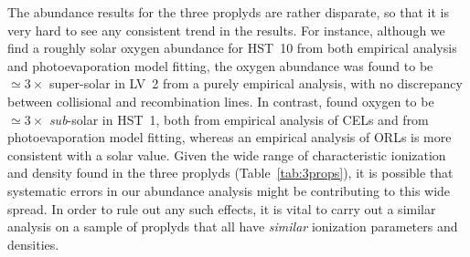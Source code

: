 \documentclass[useAMS,usenatbib]{mn2e}
\begin{document}
The abundance results for the three proplyds are rather disparate, so that it is very hard to see any consistent trend in the results.   For instance, although we find a roughly solar oxygen abundance for HST~10 from both empirical analysis and photoevaporation model fitting, the oxygen abundance was found to be \(\simeq 3 \times\) super-solar in LV~2 \citep{Tsamis:2011} from a purely empirical analysis, with no discrepancy between collisional and recombination lines.  In contrast, \citet{Mesa-Delgado:2012} found oxygen to be \(\simeq 3 \times\) \emph{sub}-solar in HST~1, both from empirical analysis of CELs and from photoevaporation model fitting, whereas an empirical analysis of ORLs is more consistent with a solar value.   Given the wide range of characteristic ionization and density found in the three proplyds (Table~\ref{tab:3props}), it is possible that systematic errors in our abundance analysis might be contributing to this wide spread.   In order to rule out any such effects, it is vital to carry out a similar analysis on a sample of proplyds that all have \emph{similar} ionization parameters and densities.






\end{document}
